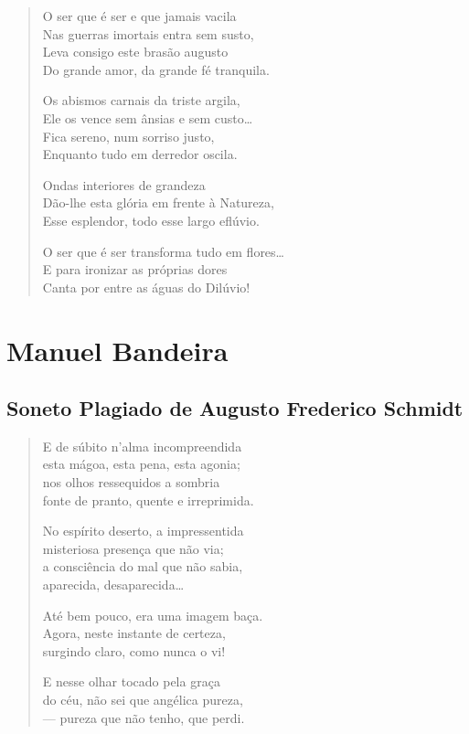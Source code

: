 \documentclass[10pt,a5paper,oneside]{book}
\begin{document}
\begin{verse}
O ser que é ser e que jamais vacila\\
Nas guerras imortais entra sem susto,\\
Leva consigo este brasão augusto\\
Do grande amor, da grande fé tranquila.

Os abismos carnais da triste argila,\\
Ele os vence sem ânsias e sem custo\ldots{}\\
Fica sereno, num sorriso justo,\\
Enquanto tudo em derredor oscila.

Ondas interiores de grandeza\\
Dão-lhe esta glória em frente à Natureza,\\
Esse esplendor, todo esse largo eflúvio.

O ser que é ser transforma tudo em flores\ldots{}\\
E para ironizar as próprias dores\\
Canta por entre as águas do Dilúvio!
\end{verse}

\part{Manuel Bandeira}

\chapter{Soneto Plagiado de Augusto Frederico Schmidt}

\begin{verse}
E de súbito n'alma incompreendida\\
esta mágoa, esta pena, esta agonia;\\
nos olhos ressequidos a sombria\\
fonte de pranto, quente e irreprimida.

No espírito deserto, a impressentida\\
misteriosa presença que não via;\\
a consciência do mal que não sabia,\\
aparecida, desaparecida\ldots{}

Até bem pouco, era uma imagem baça.\\
Agora, neste instante de certeza,\\
surgindo claro, como nunca o vi!

E nesse olhar tocado pela graça\\
do céu, não sei que angélica pureza,\\
--- pureza que não tenho, que perdi.
\end{verse}
\end{document}
